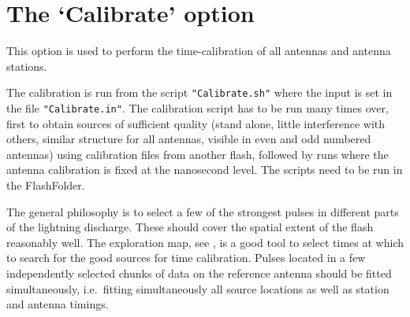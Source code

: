 \section{The `Calibrate' option}

This option is used to perform the time-calibration of all antennas and antenna stations.

The calibration is run from the script \verb!"Calibrate.sh"! where the input is set in the file \verb!"Calibrate.in"!. The calibration script has to be run many times over, first to obtain sources of sufficient quality (stand alone, little interference with others, similar structure for all antennas, visible in even and odd numbered antennas) using calibration files from another flash, followed by runs where the antenna calibration is fixed at the nanosecond level.  The scripts need to be run in the FlashFolder.

The general philosophy is to select a few of the strongest pulses in different parts of the lightning discharge. These should cover the spatial extent of the flash reasonably well. The exploration map, see , is a good tool to select times at which to search for the good sources for time calibration.
Pulses located in a few independently selected chunks of data on the reference antenna should be fitted simultaneously, i.e.\ fitting simultaneously all source locations as well as station and antenna timings.

